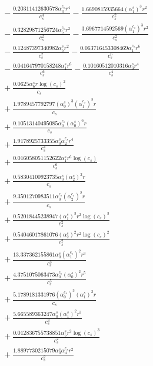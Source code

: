 \documentclass[10pt]{article}
\begin{document}
\begin{align*}
&{}  - \frac{0.20311412630578 \alpha_{3}^{c_s} r^{4}}{c_{s}^{4}} - \frac{1.6690815935664 \left(\alpha_{1}^s\right)^{3} r^{2}}{c_{s}^{2}} \\
&{}  - \frac{0.32829871256724 \alpha_{5}^{c_s} r^{2}}{c_{s}^{2}} - \frac{3.6967714592569 \left(\alpha_{1}^{c_s}\right)^{3} r^{2}}{c_{s}^{2}} \\
&{}  - \frac{0.12487397340982 \alpha_{5}^s r^{2}}{c_{s}^{2}} - \frac{0.063716453308469 \alpha_{1}^{c_s} r^{6}}{c_{s}^{6}} \\
&{}  - \frac{0.041647970158248 \alpha_{1}^s r^{6}}{c_{s}^{6}} - \frac{0.10160512010316 \alpha_{3}^s r^{4}}{c_{s}^{4}} \\
&{}  + \frac{0.0625 \alpha_{6}^s r \log{\left(c_{s} \right)}^{2}}{c_{s}} \\
&{}  + \frac{1.9789457792797 \left(\alpha_{0}^s\right)^{3} \left(\alpha_{1}^{c_s}\right)^{2} r}{c_{s}} \\
&{}  + \frac{0.10513140495085 \alpha_{0}^{c_s} \left(\alpha_{0}^s\right)^{6} r}{c_{s}} \\
&{}  + \frac{1.9178925733355 \alpha_{0}^s \alpha_{2}^{c_s} r^{4}}{c_{s}^{4}} \\
&{}  + \frac{0.016058051152622 \alpha_{1}^s r^{6} \log{\left(c_{s} \right)}}{c_{s}^{6}} \\
&{}  + \frac{0.58304100923735 \alpha_{0}^s \left(\alpha_{2}^s\right)^{2} r}{c_{s}} \\
&{}  + \frac{9.3501270983511 \alpha_{0}^{c_s} \left(\alpha_{2}^{c_s}\right)^{2} r}{c_{s}} \\
&{}  + \frac{0.52018445238947 \left(\alpha_{1}^s\right)^{3} r^{2} \log{\left(c_{s} \right)}^{3}}{c_{s}^{2}} \\
&{}  + \frac{0.54046017861076 \left(\alpha_{2}^s\right)^{2} r^{2} \log{\left(c_{s} \right)}^{2}}{c_{s}^{2}} \\
&{}  + \frac{13.337362155861 \alpha_{0}^s \left(\alpha_{1}^{c_s}\right)^{2} r^{3}}{c_{s}^{3}} \\
&{}  + \frac{4.3751075063473 \alpha_{0}^{c_s} \left(\alpha_{0}^s\right)^{2} r^{5}}{c_{s}^{5}} \\
&{}  + \frac{5.1789181331976 \left(\alpha_{0}^{c_s}\right)^{3} \left(\alpha_{1}^s\right)^{2} r}{c_{s}} \\
&{}  + \frac{5.665589363247 \alpha_{0}^s \left(\alpha_{1}^s\right)^{2} r^{3}}{c_{s}^{3}} \\
&{}  + \frac{0.012836755738851 \alpha_{5}^s r^{2} \log{\left(c_{s} \right)}^{3}}{c_{s}^{2}} \\
&{}  + \frac{1.8897730215079 \alpha_{0}^s \alpha_{4}^{c_s} r^{2}}{c_{s}^{2}} \\

\end{align*}
\end{document}

